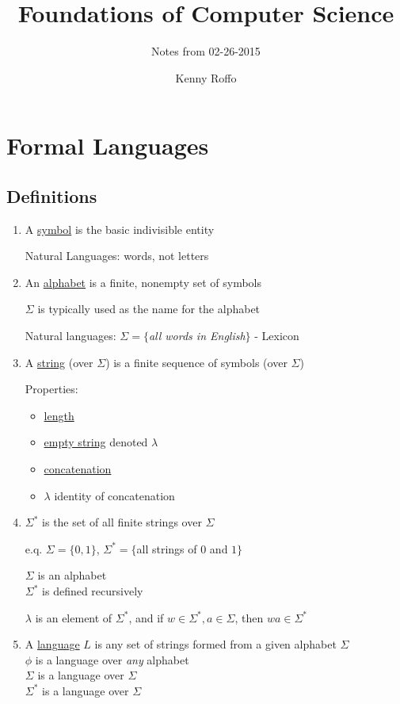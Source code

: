 \documentclass{scrartcl}
\title{Foundations of Computer Science}
\subtitle{Notes from 02-26-2015}
\author{Kenny Roffo}
\begin{document}
\maketitle
\tableofcontents

\section{Formal Languages}

\subsection{Definitions}

\begin{enumerate}

\item A \underline{symbol} is the basic indivisible entity

Natural Languages: words, not letters

\item An \underline{alphabet} is a finite, nonempty set of symbols

$\Sigma$ is typically used as the name for the alphabet

Natural languages: $\Sigma=\{$\emph{all words in English}$\}$ - Lexicon 

\item A \underline{string} (over $\Sigma$) is a finite sequence of symbols (over $\Sigma$)

  Properties: \begin{itemize}
  \item \underline{length}
  \item \underline{empty string} denoted $\lambda$
  \item \underline{concatenation}
  \item $\lambda$ identity of concatenation
  \end{itemize} 

\item $\Sigma ^*$ is the set of all finite strings over $\Sigma$

e.q. $\Sigma=\{0,1\}$, $\Sigma ^* = \{$all strings of $0$ and $1\}$

$\Sigma$ is an alphabet\\
$\Sigma ^*$ is defined recursively

$\lambda$ is an element of $\Sigma ^*$, and if $w \in \Sigma ^*, a \in \Sigma$, then $wa \in \Sigma ^*$

\item A \underline{language} $L$ is any set of strings formed from a given alphabet $\Sigma$\\
$\phi$ is a language over \emph{any} alphabet\\
$\Sigma$ is a language over $\Sigma$\\
$\Sigma ^*$ is a language over $\Sigma$
\end{enumerate}
\end{document}
